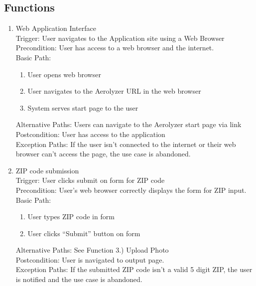 \documentclass[journal,10pt,draftclsnofoot,onecolumn]{IEEEtran}
\begin{document}
\begin{singlespace}
	\subsection{Functions}
		\begin{enumerate}
			\item Web Application Interface\\
			Trigger: User navigates to the Application site using a Web Browser\\
			Precondition: User has access to a web browser and the internet.\\
			Basic Path:\begin{enumerate}
			\item User opens web browser
			\item User navigates to the Aerolyzer URL in the web browser
			\item System serves start page to the user
		\end{enumerate}
		Alternative Paths: Users can navigate to the Aerolyzer start page via link\\
		Postcondition: User has access to the application\\
		Exception Paths: If the user isn't connected to the internet or their web browser can't access the page, the use case is abandoned.
	

	\item ZIP code submission\\
		Trigger: User clicks submit on form for ZIP code\\
		Precondition: User's web browser correctly displays the form for ZIP input.\\
		Basic Path:
		\begin{enumerate}
			\item User types ZIP code in form
			\item User clicks “Submit” button on form
		\end{enumerate}
		Alternative Paths: See Function 3.) Upload Photo\\
		Postcondition: User is navigated to output page.\\
		Exception Paths: If the submitted ZIP code isn't a valid 5 digit ZIP, the user is notified and the use case is abandoned.
	


\end{enumerate}
\end{singlespace}
\end{document}
